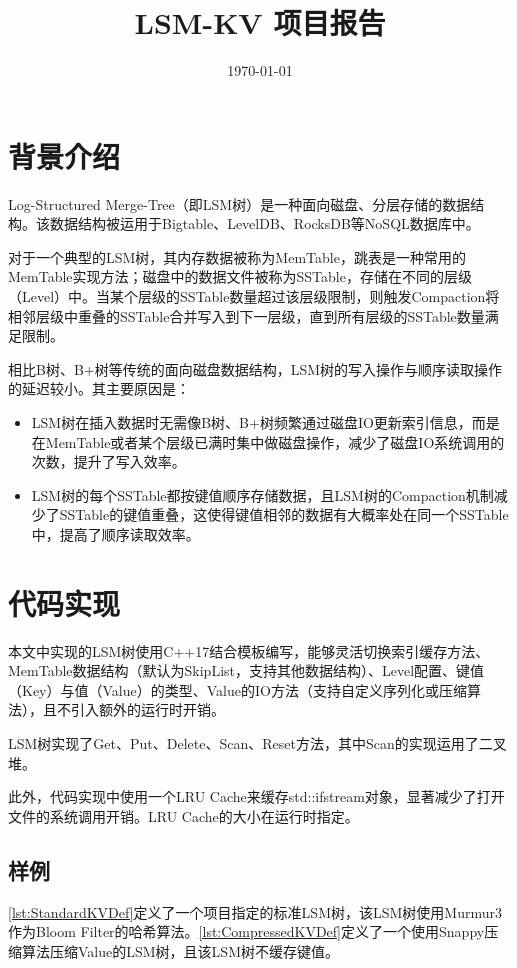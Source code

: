 \documentclass[a4paper,UTF8]{ctexart}
\begin{document}
\title{LSM-KV 项目报告}
\date{\today}
\maketitle

\section{背景介绍}
Log-Structured Merge-Tree\cite{o1996log}（即LSM树）是一种面向磁盘、分层存储的数据结构。该数据结构被运用于Bigtable\cite{chang2008bigtable}、LevelDB、RocksDB等NoSQL数据库中。
\par
对于一个典型的LSM树，其内存数据被称为MemTable，跳表是一种常用的MemTable实现方法；磁盘中的数据文件被称为SSTable，存储在不同的层级（Level）中。当某个层级的SSTable数量超过该层级限制，则触发Compaction将相邻层级中重叠的SSTable合并写入到下一层级，直到所有层级的SSTable数量满足限制。
\par
相比B树、B+树等传统的面向磁盘数据结构，LSM树的写入操作与顺序读取操作的延迟较小。其主要原因是：
\begin{itemize}
	\item LSM树在插入数据时无需像B树、B+树频繁通过磁盘IO更新索引信息，而是在MemTable或者某个层级已满时集中做磁盘操作，减少了磁盘IO系统调用的次数，提升了写入效率。
	\item LSM树的每个SSTable都按键值顺序存储数据，且LSM树的Compaction机制减少了SSTable的键值重叠，这使得键值相邻的数据有大概率处在同一个SSTable中，提高了顺序读取效率。
\end{itemize}

\section{代码实现}
本文中实现的LSM树使用C++17结合模板编写，能够灵活切换索引缓存方法、MemTable数据结构（默认为SkipList，支持其他数据结构）、Level配置、键值（Key）与值（Value）的类型、Value的IO方法（支持自定义序列化或压缩算法），且不引入额外的运行时开销。
\par
LSM树实现了Get、Put、Delete、Scan、Reset方法，其中Scan的实现运用了二叉堆。
\par
此外，代码实现中使用一个LRU Cache来缓存std::ifstream对象，显著减少了打开文件的系统调用开销。LRU Cache的大小在运行时指定。

\subsection{样例}
\autoref{lst:StandardKVDef}定义了一个项目指定的标准LSM树，该LSM树使用Murmur3作为Bloom Filter的哈希算法。\autoref{lst:CompressedKVDef}定义了一个使用Snappy压缩算法压缩Value的LSM树，且该LSM树不缓存键值。
\end{document}
